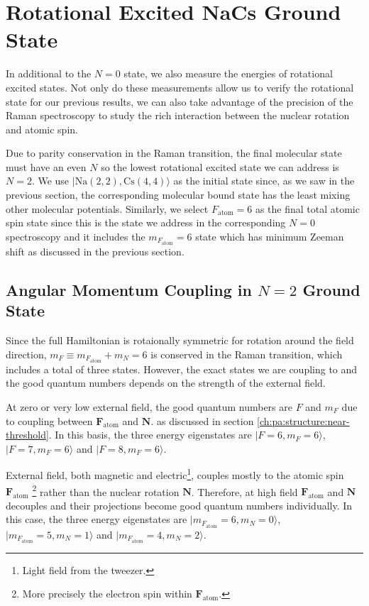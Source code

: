 \section{Rotational Excited NaCs Ground State}
\label{ch:raman-spectroscopy:n2}

In additional to the $N=0$ state, we also measure the energies of rotational excited states.
Not only do these measurements allow us to verify the rotational state for our previous results,
we can also take advantage of the precision of the Raman spectroscopy
to study the rich interaction between the nuclear rotation and atomic spin.

Due to parity conservation in the Raman transition,
the final molecular state must have an even $N$
so the lowest rotational excited state we can address is $N=2$.
We use $|\mathrm{Na(2, 2),Cs(4, 4)}\rangle$ as the initial state since,
as we saw in the previous section, the corresponding molecular bound state
has the least mixing other molecular potentials.
Similarly, we select $F_{\mathrm{atom}}=6$ as the final total atomic spin state
since this is the state we address in the corresponding $N=0$ spectroscopy and
it includes the $m_{F_{\mathrm{atom}}}=6$ state which has minimum
Zeeman shift as discussed in the previous section.

\subsection{Angular Momentum Coupling in $N=2$ Ground State}
\label{ch:raman-spectroscopy:n2:angular-momentum}

Since the full Hamiltonian is rotaionally symmetric for rotation around the field direction,
$m_F\equiv m_{F_{\mathrm{atom}}}+m_{N}=6$ is conserved in the Raman transition,
which includes a total of three states.
However, the exact states we are coupling to and the good quantum numbers depends on
the strength of the external field.

At zero or very low external field, the good quantum numbers are $F$ and $m_F$
due to coupling between $\mathbf{F}_{\mathrm{atom}}$ and $\mathbf{N}$.
as discussed in section \ref{ch:pa:structure:near-threshold}.
In this basis, the three energy eigenstates are
$|F=6,m_F=6\rangle$, $|F=7,m_F=6\rangle$ and $|F=8,m_F=6\rangle$.

External field, both magnetic and electric\footnote{Light field from the tweezer.},
couples mostly to the atomic spin $\mathbf{F}_{\mathrm{atom}}$
\footnote{More precisely the electron spin within $\mathbf{F}_{\mathrm{atom}}$.}
rather than the nuclear rotation $\mathbf{N}$.
Therefore, at high field $\mathbf{F}_{\mathrm{atom}}$ and $\mathbf{N}$
decouples and their projections become good quantum numbers individually.
In this case, the three energy eigenstates are
$|m_{F_\mathrm{atom}}=6,m_N=0\rangle$, $|m_{F_\mathrm{atom}}=5,m_N=1\rangle$ and
$|m_{F_\mathrm{atom}}=4,m_N=2\rangle$.

